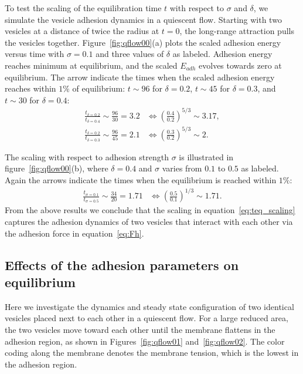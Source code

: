 \documentclass[%
preprint,
 amsmath,amssymb,
 aps,
]{revtex4-1}
\begin{document}
To test the scaling of the equilibration time $t$ with respect to $\sigma$ and $\delta$, we simulate the vesicle adhesion dynamics in a quiescent flow.
Starting with two vesicles at a distance of twice the radius at $t=0$, the long-range attraction pulls the vesicles together. Figure~\ref{fig:qflow00}(a) plots
the scaled adhesion energy versus time with $\sigma=0.1$ and three values of $\delta$ as labeled. 
Adhesion energy reaches minimum at equilibrium, and the scaled $E_{adh}$ evolves towards zero at equilibrium. 
The arrow indicate the times when the scaled adhesion energy
reaches within $1\%$ of equilibrium: $t\sim 96$ for $\delta=0.2$, $t\sim 45$ for $\delta = 0.3$, and $t\sim 30$ for $\delta=0.4$:
\begin{align}
\frac{t_{\delta=0.2}}{t_{\delta=0.4}} \sim \frac{96}{30}=3.2 &\Longleftrightarrow \left(\frac{0.4}{0.2}\right)^{5/3}\sim 3.17,\\
\frac{t_{\delta=0.2}}{t_{\delta=0.3}} \sim \frac{96}{45}=2.1 &\Longleftrightarrow \left(\frac{0.3}{0.2}\right)^{5/3}\sim 2.
\end{align}

The scaling with respect to adhesion strength $\sigma$ is illustrated in figure~\ref{fig:qflow00}(b), where $\delta = 0.4$ and $\sigma$ varies from $0.1$ to $0.5$ as labeled.
Again the arrows indicate the times when the equilibrium is reached within $1\%$:
\begin{align}
\frac{t_{\sigma=0.1}}{t_{\sigma=0.5}} \sim \frac{34}{20} = 1.71 &\Longleftrightarrow \left(\frac{0.5}{0.1}\right)^{1/3}\sim 1.71.
\end{align}
From the above results we conclude that the scaling in equation~\ref{eq:teq_scaling} captures the adhesion dynamics of two vesicles that interact with each other via the adhesion force in equation~\ref{eq:Fh}.


\subsection{Effects of the adhesion parameters on equilibrium}
\label{subsec:qflow_adhesion_parameters} 
Here we investigate the dynamics and steady state configuration of two
identical vesicles placed next to each other in a quiescent flow.  For a
large reduced area, the two vesicles move toward each other until the
membrane flattens in the adhesion region, as shown in
Figures~\ref{fig:qflow01} and~\ref{fig:qflow02}.  The color coding along
the membrane denotes the membrane tension, which is the lowest in the
adhesion region.
\end{document}
